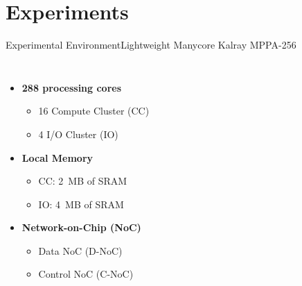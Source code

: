 
\section{Experiments}

	\begin{frame}[fragile]{Experimental Environment}{Lightweight Manycore Kalray MPPA-256}
		\begin{columns}[totalwidth=\linewidth]

				\begin{itemize}
					\setlength\itemsep{4mm}
					\item \textbf{288 processing cores}
					\begin{itemize}
						\item 16 Compute Cluster (CC)
						\item 4 I/O Cluster (IO)
					\end{itemize}
					\item \textbf{Local Memory}
					\begin{itemize}
						\item CC: 2~MB of SRAM
						\item IO: 4~MB of SRAM
					\end{itemize}
					\item \textbf{Network-on-Chip (NoC)}
					\begin{itemize}
						\item Data NoC (D-NoC)
						\item Control NoC (C-NoC)
					\end{itemize}
				\end{itemize}

		\end{columns}

	\end{frame}

